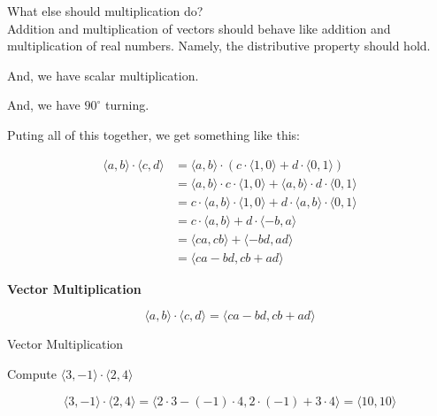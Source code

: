 \documentclass{ximera}
\begin{document}
What else should multiplication do? \\


Addition and multiplication of vectors should behave like addition and multiplication of real numbers.  Namely, the distributive property should hold.

And, we have scalar multiplication.

And, we have $90^{\circ}$ turning.

Puting all of this together, we get something like this:



\begin{align*}
\langle a, b \rangle  \cdot \langle c, d \rangle & = \langle a, b \rangle  \cdot (  c \cdot \langle 1, 0 \rangle    +  d \cdot \langle 0, 1 \rangle    )    \\
    & = \langle a, b \rangle \cdot c \cdot \langle 1, 0 \rangle     +      \langle a, b \rangle \cdot d \cdot \langle 0, 1 \rangle      \\
    & = c \cdot \langle a, b \rangle \cdot  \langle 1, 0 \rangle     +    d \cdot  \langle a, b \rangle \cdot  \langle 0, 1 \rangle      \\
    & = c \cdot \langle a, b \rangle   + d \cdot  \langle -b, a \rangle \\
    & =  \langle c a, c b \rangle   +   \langle -b d, a d \rangle \\
    & =  \langle c a - b d, c b + a d \rangle   
\end{align*} 







\begin{definition}  \textbf{\textcolor{green!50!black}{Vector Multiplication}}  


\[    \langle a, b \rangle  \cdot \langle c, d \rangle =   \langle c a - b d, c b + a d \rangle   \]


\end{definition}








\begin{example} Vector Multiplication

Compute  $\langle 3, -1 \rangle  \cdot \langle 2, 4 \rangle$

\begin{explanation}


\[
\langle 3, -1 \rangle  \cdot \langle 2, 4 \rangle = \langle 2 \cdot 3 - (-1) \cdot 4, 2 \cdot (-1) + 3 \cdot 4 \rangle = \langle 10, 10 \rangle 
\]
\end{explanation}

\end{example}
\end{document}
